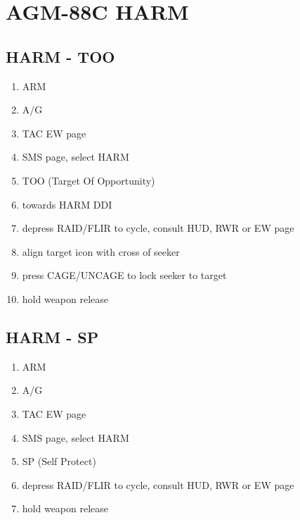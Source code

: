 \documentclass[fontHelvetica, widesubsec]{TechCheck}
\begin{document}
	\section{AGM-88C HARM}

	\subsection{HARM - TOO}
	\begin{enumerate}
		\item {}\dotfill ARM
		\item {}\dotfill A/G
		\item {}\dotfill TAC EW page
		\item {}\dotfill SMS page, select HARM
		\item {}\dotfill TOO (Target Of Opportunity)
		\item {}\dotfill towards HARM DDI
		\item {}\dotfill depress RAID/FLIR to cycle, consult HUD, RWR or EW page
		\item {}\dotfill align target icon with cross of seeker
		\item {}\dotfill press CAGE/UNCAGE to lock seeker to target
		\item {}\dotfill hold weapon release
	\end{enumerate}

	\subsection{HARM - SP}
	\begin{enumerate}
		\item {}\dotfill ARM
		\item {}\dotfill A/G
		\item {}\dotfill TAC EW page
		\item {}\dotfill SMS page, select HARM
		\item {}\dotfill SP (Self Protect)
		\item {}\dotfill depress RAID/FLIR to cycle, consult HUD, RWR or EW page
		\item {}\dotfill hold weapon release
	\end{enumerate}
\end{document}
